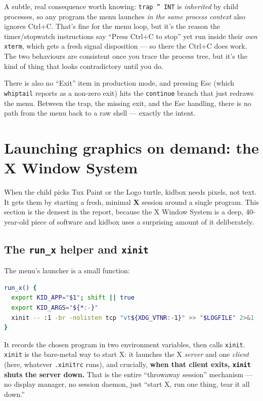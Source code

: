 \documentclass[11pt,oneside]{article}
\newcommand{\code}[1]{\texorpdfstring{\textcolor{kbblue}{\texttt{#1}}}{#1}}
\newcommand{\file}[1]{\textcolor{kbteal}{\texttt{#1}}}
\begin{document}
\begin{fieldnote}
A subtle, real consequence worth knowing: \code{trap '' INT} is \emph{inherited}
by child processes, so any program the menu launches \emph{in the same process
context} also ignores Ctrl+C. That's fine for the menu loop, but it's the reason
the timer/stopwatch instructions say ``Press Ctrl+C to stop'' yet run inside
their \emph{own} \texttt{xterm}, which gets a fresh signal disposition --- so
there the Ctrl+C does work. The two behaviours are consistent once you trace the
process tree, but it's the kind of thing that looks contradictory until you do.
\end{fieldnote}

There is also no ``Exit'' item in production mode, and pressing Esc (which
\texttt{whiptail} reports as a non-zero exit) hits the \code{continue} branch
that just redraws the menu. Between the trap, the missing exit, and the Esc
handling, there is no path from the menu back to a raw shell --- exactly the
intent.

\section{Launching graphics on demand: the X Window System}

When the child picks Tux Paint or the Logo turtle, kidbox needs pixels, not
text. It gets them by starting a fresh, minimal \textbf{X} session around a
single program. This section is the densest in the report, because the X Window
System is a deep, 40-year-old piece of software and kidbox uses a surprising
amount of it deliberately.

\subsection{The \texttt{run\_x} helper and \texttt{xinit}}

The menu's launcher is a small function:

\begin{lstlisting}[language=bash]
run_x() {
  export KID_APP="$1"; shift || true
  export KID_ARGS="${*:-}"
  xinit -- :1 -br -nolisten tcp "vt${XDG_VTNR:-1}" >> "$LOGFILE" 2>&1
}
\end{lstlisting}

It records the chosen program in two environment variables, then calls
\texttt{xinit}. \texttt{xinit} is the bare-metal way to start X: it launches the
X \emph{server} and one \emph{client} (here, whatever \file{.xinitrc} runs), and
crucially, \textbf{when that client exits, \texttt{xinit} shuts the server
down.} That is the entire ``throwaway session'' mechanism --- no display
manager, no session daemon, just ``start X, run one thing, tear it all down.''
\end{document}
